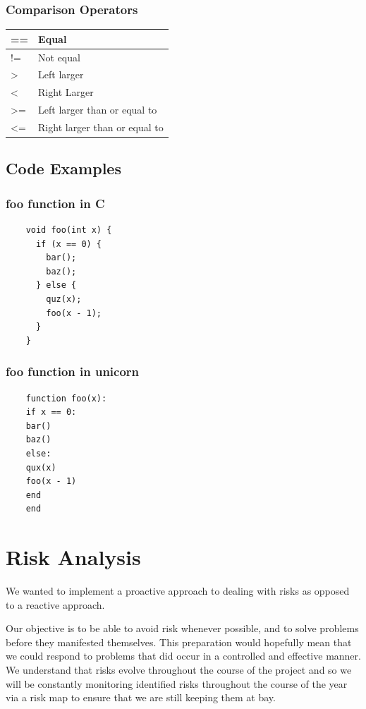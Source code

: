 \documentclass[a4paper,12pt]{article}
\begin{document}
\begin{multicols}{2}
  \subsubsection*{Comparison Operators}
  \begin{tabular}{| l | l | } \hline
    == & Equal \\ \hline
    != & Not equal \\ \hline
    \textgreater & Left larger \\ \hline
    \textless & Right Larger \\ \hline
    \textgreater= & Left larger than or equal to \\ \hline
    \textless= & Right larger than or equal to \\ \hline
  \end{tabular}

\end{multicols}

\subsection*{Code Examples}
\begin{multicols}{2}
  \subsubsection*{foo function in C}
  \begin{lstlisting}
    void foo(int x) {
      if (x == 0) {
        bar();
        baz();
      } else {
        quz(x);
        foo(x - 1);
      }
    }
  \end{lstlisting}
  \subsubsection*{foo function in unicorn}
  \begin{lstlisting}
    function foo(x):
    if x == 0:
    bar()
    baz()
    else:
    qux(x)
    foo(x - 1)
    end
    end
  \end{lstlisting}
\end{multicols}

\pagebreak
\section*{Risk Analysis}

We wanted to implement a proactive approach to dealing with risks as opposed to a reactive approach.

Our objective is to be able to avoid risk whenever possible, and to solve problems before they manifested themselves. This preparation would hopefully mean that we could respond to problems that did occur in a controlled and effective manner. We understand that risks evolve throughout the course of the project and so we will be constantly monitoring identified risks throughout the course of the year via a risk map to ensure that we are still keeping them at bay. 
\end{document}
